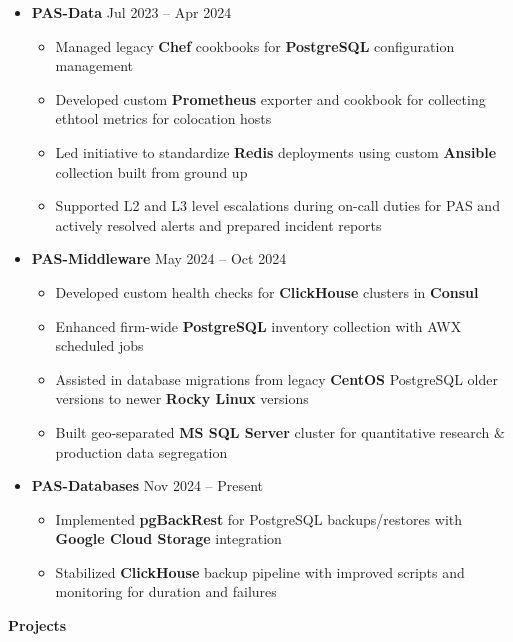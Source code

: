 \documentclass[10pt,a4paper]{article}
\newcommand{\customsection}[1]{%
    \vspace{0.5em}
    \noindent\colorbox{sectionblue}{\parbox{\dimexpr\textwidth-2\fboxsep}{%
        \vspace{0.14em}\centering\textbf{\fontsize{10}{12}\selectfont #1}\vspace{0.14em}%
    }}
    \vspace{0.4em}
}
\begin{document}
\begin{itemize}
    \item \textbf{PAS-Data} \hfill Jul 2023 -- Apr 2024
    \begin{itemize}
        \item Managed legacy \textbf{Chef} cookbooks for \textbf{PostgreSQL} configuration management
        \item Developed custom \textbf{Prometheus} exporter and cookbook for collecting ethtool metrics for colocation hosts
        \item Led initiative to standardize \textbf{Redis} deployments using custom \textbf{Ansible} collection built from ground up
        \item Supported L2 and L3 level escalations during on-call duties for PAS and actively resolved alerts and prepared incident reports
    \end{itemize}

    \item \textbf{PAS-Middleware} \hfill May 2024 -- Oct 2024
    \begin{itemize}
        \item Developed custom health checks for \textbf{ClickHouse} clusters in \textbf{Consul}
        \item Enhanced firm-wide \textbf{PostgreSQL} inventory collection with AWX scheduled jobs
        \item Assisted in database migrations from legacy \textbf{CentOS} PostgreSQL older versions to newer \textbf{Rocky Linux} versions
        \item Built geo-separated \textbf{MS SQL Server} cluster for quantitative research \& production data segregation
    \end{itemize}

    \item \textbf{PAS-Databases} \hfill Nov 2024 -- Present
    \begin{itemize}
        \item Implemented \textbf{pgBackRest} for PostgreSQL backups/restores with \textbf{Google Cloud Storage} integration
        \item Stabilized \textbf{ClickHouse} backup pipeline with improved scripts and monitoring for duration and failures
    \end{itemize}
\end{itemize}

\vspace{0.7em}

\customsection{Projects}
\end{document}
